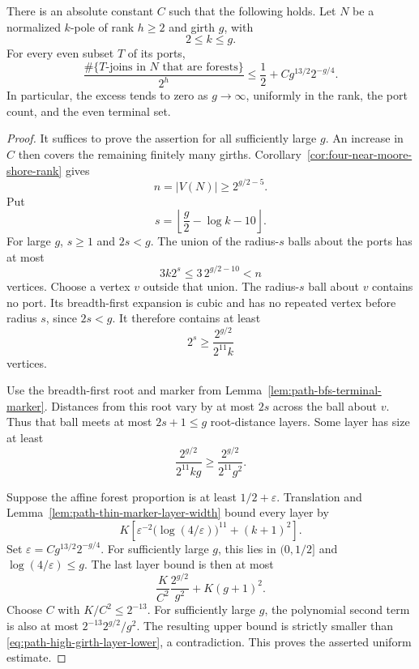 \begin{theorem}
\label{thm:path-high-girth-terminal-forests}
There is an absolute constant $C$ such that the following holds.
Let $N$ be a normalized $k$-pole of rank $h\ge2$ and girth $g$, with
\[
 2\le k\le g.
\]
For every even subset $T$ of its ports,
\[
 \frac{\#\{T\text{-joins in }N\text{ that are forests}\}}{2^h}
 \le\frac12+C g^{13/2}2^{-g/4}.
\]
In particular, the excess tends to zero as $g\to\infty$, uniformly in the rank, the port count, and the even terminal set.
\end{theorem}

\begin{proof}
It suffices to prove the assertion for all sufficiently large $g$.
An increase in $C$ then covers the remaining finitely many girths.
Corollary~\ref{cor:four-near-moore-shore-rank} gives
\[
 n=|V(N)|\ge2^{g/2-5}.
\]
Put
\[
 s=\left\lfloor\frac g2-\log k-10\right\rfloor.
\]
For large $g$, $s\ge1$ and $2s<g$.
The union of the radius-$s$ balls about the ports has at most
\[
 3k2^s\le3\,2^{g/2-10}<n
\]
vertices.
Choose a vertex $v$ outside that union.
The radius-$s$ ball about $v$ contains no port.
Its breadth-first expansion is cubic and has no repeated vertex before radius $s$, since $2s<g$.
It therefore contains at least
\[
 2^s\ge\frac{2^{g/2}}{2^{11}k}
\]
vertices.

Use the breadth-first root and marker from Lemma~\ref{lem:path-bfs-terminal-marker}.
Distances from this root vary by at most $2s$ across the ball about $v$.
Thus that ball meets at most $2s+1\le g$ root-distance layers.
Some layer has size at least
\begin{equation}\label{eq:path-high-girth-layer-lower}
 \frac{2^{g/2}}{2^{11}kg}
 \ge\frac{2^{g/2}}{2^{11}g^2}.
\end{equation}

Suppose the affine forest proportion is at least $1/2+\varepsilon$.
Translation and Lemma~\ref{lem:path-thin-marker-layer-width} bound every layer by
\[
 K\left[
 \varepsilon^{-2}\bigl(\log(4/\varepsilon)\bigr)^{11}
 +(k+1)^2\right].
\]
Set $\varepsilon=Cg^{13/2}2^{-g/4}$.
For sufficiently large $g$, this lies in $(0,1/2]$ and
$\log(4/\varepsilon)\le g$.
The last layer bound is then at most
\[
 \frac{K}{C^2}\frac{2^{g/2}}{g^2}+K(g+1)^2.
\]
Choose $C$ with $K/C^2\le2^{-13}$.
For sufficiently large $g$, the polynomial second term is also at most
$2^{-13}2^{g/2}/g^2$.
The resulting upper bound is strictly smaller than
\eqref{eq:path-high-girth-layer-lower}, a contradiction.
This proves the asserted uniform estimate.
\end{proof}

